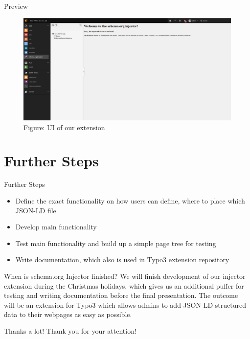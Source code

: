 \documentclass{beamer}
\begin{document}
\begin{frame}{Preview}
\begin{figure}[ht]
\centering
\includegraphics[width=1.0\textwidth]{example_image.png}
\caption{Figure: UI of our extension}
\end{figure}
\end{frame}


\section{Further Steps}

\begin{frame}{Further Steps}

\begin{itemize}
\item Define the exact functionality on how users can define, where to place which JSON-LD file
\item Develop main functionality
\item Test main functionality and build up a simple page tree for testing
\item Write documentation, which also is used in Typo3 extension repository
\end{itemize}


\begin{block}{When is schema.org Injector finished?}
We will finish development of our injector extension during the Christmas holidays, which gives us an additional puffer for testing and writing documentation before the final presentation.
The outcome will be an extension for Typo3 which allows admins to add JSON-LD structured data to their webpages as easy as possible.
\end{block}
\end{frame}

\begin{frame}{Thanks a lot!}
	Thank you for your attention!
\end{frame}
\end{document}
